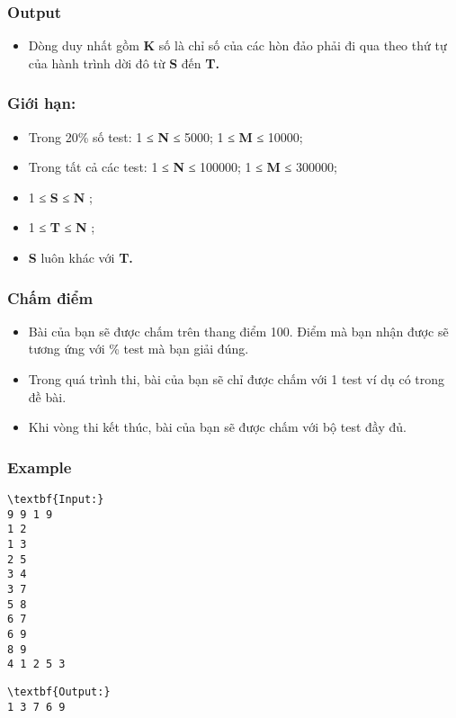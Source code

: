 \subsubsection{Output}
\begin{itemize}
	\item Dòng duy nhất gồm \textbf{ K } số là chỉ số của các hòn đảo phải đi qua theo thứ tự của hành trình dời đô từ \textbf{ S } đến \textbf{ T. }
\end{itemize}

\subsubsection{Giới hạn:}
\begin{itemize}
	\item Trong 20\% số test: 1 ≤ \textbf{ N } ≤ 5000; 1 ≤ \textbf{ M } ≤ 10000;
	\item Trong tất cả các test: 1 ≤ \textbf{ N } ≤ 100000; 1 ≤ \textbf{ M } ≤ 300000;
	\item 1 ≤ \textbf{ S } ≤ \textbf{ N } ;
	\item 1 ≤ \textbf{ T } ≤ \textbf{ N } ;
	\item \textbf{S } luôn khác với \textbf{ T. }
\end{itemize}

\subsubsection{Chấm điểm}
\begin{itemize}
	\item Bài của bạn sẽ được chấm trên thang điểm 100. Điểm mà bạn nhận được sẽ tương ứng với \% test mà bạn giải đúng.
	\item Trong quá trình thi, bài của bạn sẽ chỉ được chấm với 1 test ví dụ có trong đề bài.
	\item Khi vòng thi kết thúc, bài của bạn sẽ được chấm với bộ test đầy đủ.
\end{itemize}
\begin{itemize}
\end{itemize}

\subsubsection{Example}
\begin{verbatim}
\textbf{Input:}
9 9 1 9
1 2
1 3
2 5
3 4
3 7
5 8
6 7
6 9
8 9
4 1 2 5 3\end{verbatim}
\begin{verbatim}
\textbf{Output:}
1 3 7 6 9\end{verbatim}